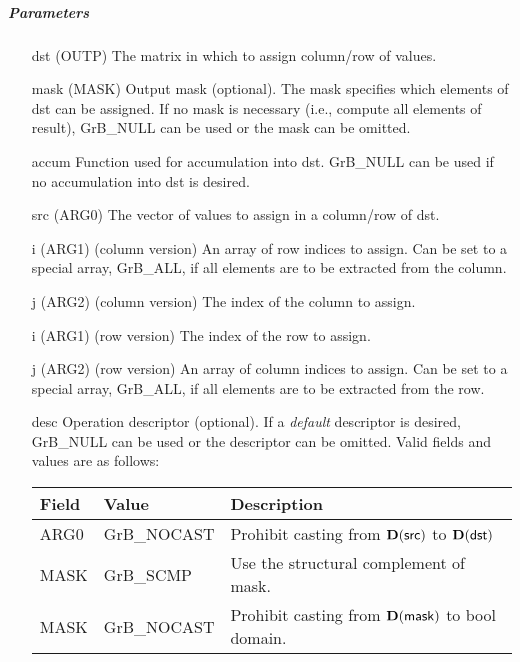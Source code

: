 \subparagraph{Parameters}

\begin{itemize}[leftmargin=1.1in]
    \item[{\sf dst}]   ({\sf OUTP}) The matrix in which to assign column/row of values.
    \item[{\sf mask}]  ({\sf MASK}) Output mask (optional). The mask
    specifies which elements of {\sf dst} can be assigned.
    If no mask is necessary (i.e., compute all elements of result),
    {\sf GrB\_NULL} can be used or the mask can be omitted.
    \item[{\sf accum}] Function used for accumulation into dst.  {\sf GrB\_NULL}
                       can be used if no accumulation into dst is desired.
    \item[{\sf src}]   ({\sf ARG0}) The vector of values to assign in a column/row of dst.

    \item[{\sf i}]     ({\sf ARG1}) (column version) An array of row indices to assign. Can
                              be set to a special array, {\sf GrB\_ALL}, if all elements
                              are to be extracted from the column.
    \item[{\sf j}]     ({\sf ARG2}) (column version) The index of the column to assign.

    \item[{\sf i}]     ({\sf ARG1}) (row version) The index of the row to assign.
    \item[{\sf j}]     ({\sf ARG2}) (row version) An array of column indices to assign. Can
                              be set to a special array, {\sf GrB\_ALL}, if all elements
                              are to be extracted from the row.


    \item[{\sf desc}]   Operation descriptor (optional). If a
    \emph{default} descriptor is desired, {\sf GrB\_NULL} can be
    used or the descriptor can be omitted.  Valid fields and values are as follows: \\
    \begin{tabular}{lll}
    Field  & Value & Description \\
    \hline
    {\sf ARG0} & {\sf GrB\_NOCAST} & Prohibit casting from $\bold{D}({\sf src})$ to $\bold{D}({\sf dst})$ \\
    {\sf MASK} & {\sf GrB\_SCMP} & Use the structural complement of {\sf mask}. \\
    {\sf MASK} & {\sf GrB\_NOCAST} & Prohibit casting from $\bold{D}({\sf mask})$ to {\sf bool} domain. \\
    \end{tabular}

\end{itemize}

